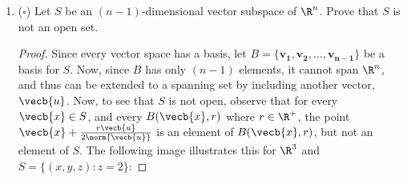 \documentclass[letterpaper]{article}
\begin{document}
\begin{enumerate}
\begin{multicols}{2}
\begin{enumerate}[label=(\alph*)]
	\item $\{(x,y,z):x^2+y^2<1\}\subset\R^3$\\
	\textbf{Answer:} Open and not closed. 
	\qedwhite
	\end{enumerate}
	\end{multicols}
	
	\begin{enumerate}
	\setcounter{enumi}{4}	
	\item $\{(x_1, \ldots, x_n): \text{each } x_i\in\Q\}\subset \R^n$\\
	\textbf{Answer:} Not open and not closed. \\
	This set is impossible to draw. I imagine it something like a dense infinite point grid, like a field of stars in space. Each element has infinitely many other elements surrounding it in every direction, as well as elements not in the set surrounding it in a similar way. \qed
	\end{enumerate}


\item ($\square$) Let $S$ be an $(n-1)$-dimensional vector subspace of $\R^n$. Prove that $S$ is not an open set. 
\begin{proof}
Since every vector space has a basis, let $B=\{\mathbf{v_1}, \mathbf{v_2}, \ldots, \mathbf{v_{n-1}}\}$ be a basis for $S$. Now, since $B$ has only $(n-1)$ elements, it cannot span $\R^n$, and thus can be extended to a spanning set by including another vector, 
$\vecb{u}$. Now, to see that $S$ is not open, observe that for every $\vecb{x}\in S$, and every $B(\vecb{x},r)$ where $r\in\R^+$, the point $\vecb{x}+\frac{r\vecb{u}}{2\norm{\vecb{u}}}$ is an element of $B(\vecb{x},r)$, but not an element of $S$. The following image illustrates this for $\R^3$ and $S=\{(x,y,z):z=2\}$:
\end{proof}


\end{enumerate}
\end{document}
